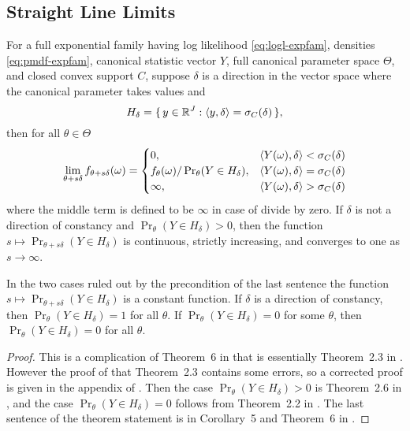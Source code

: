 \subsection{Straight Line Limits}

\begin{theorem} \label{th:completion-fundamental}
For a full exponential family having log likelihood \eqref{eq:logl-expfam},
densities \eqref{eq:pmdf-expfam}, canonical statistic vector $Y$,
full canonical parameter space $\Theta$, and closed convex support $C$,
suppose $\delta$ is a direction in the vector space where the canonical
parameter takes values and
\begin{equation} \label{eq:complete-fundamental-hyperplane}
   H_\delta = \{\,  y \in \mathbb{R}^J : \langle y, \delta \rangle = \sigma_C(\delta)  \,\},
\end{equation}
then for all $\theta \in \Theta$
\begin{equation} \label{eq:complete-fundamental-limit}
   \lim_{\theta + s \delta} f_{\theta + s \delta}(\omega)
   =
   \begin{cases}
   0, & \langle Y(\omega), \delta \rangle < \sigma_C(\delta)
   \\
   f_\theta(\omega) / \Pr_\theta(Y \in H_\delta),
   & \langle Y(\omega), \delta \rangle = \sigma_C(\delta)
   \\
   \infty, & \langle Y(\omega), \delta \rangle > \sigma_C(\delta)
   \end{cases}
\end{equation}
where the middle term is defined to be $\infty$ in case of divide by zero.
If $\delta$ is not a direction of constancy
and $\Pr_\theta(Y \in H_\delta) > 0$, then the function
$s \mapsto \Pr_{\theta + s \delta}(Y \in H_\delta)$ is continuous,
strictly increasing, and converges to one
as $s \to \infty$.
\end{theorem}
In the two cases ruled out by the precondition of the last sentence
the function $s \mapsto \Pr_{\theta + s \delta}(Y \in H_\delta)$ is
a constant function.  If $\delta$ is a direction of constancy,
then $\Pr_\theta(Y \in H_\delta) = 1$ for all $\theta$.
If $\Pr_\theta(Y \in H_\delta) = 0$ for some $\theta$,
then $\Pr_\theta(Y \in H_\delta) = 0$ for all $\theta$.
\begin{proof}
This is a complication of Theorem~{6} in \citet{geyer-gdor}
that is essentially Theorem~{2.3} in \citet{geyer-thesis}.
However the proof of that Theorem~{2.3} contains some errors,
so a corrected proof is given in the appendix of \citet{geyer-gdor}.
Then the case $\Pr_\theta(Y \in H_\delta) > 0$ is Theorem~{2.6}
in \citet{geyer-thesis},
and the case $\Pr_\theta(Y \in H_\delta) = 0$ follows from Theorem~{2.2}
in \citet{geyer-thesis}.
The last sentence of the theorem statement is in Corollary~{5} and Theorem~{6}
in \citet{geyer-gdor}.
\end{proof}
